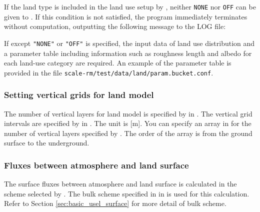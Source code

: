 If the land type is included in the land use setup by , neither \verb|NONE| nor \verb|OFF| can be given to . If this condition is not satisfied, the program immediately terminates without computation, outputting the following message to the LOG file:

If  except \verb|"NONE"| or \verb|"OFF"| is specified,
the input data of land use distribution and a parameter table including information such as roughness length and albedo for each land-use category are required.
An example of the parameter table is provided
in the file \verb|scale-rm/test/data/land/param.bucket.conf|.\\

\subsubsection{Setting vertical grids for land model}

The number of vertical layers for land model is specified by  in .
The vertical grid intervals are specified by  in . The unit is [m].
You can specify an array in  for the number of vertical layers specified by .
The order of the array is from the ground surface to the underground.


\subsubsection{Fluxes between atmosphere and land surface}
The surface fluxes between atmosphere and land surface is calculated in the scheme selected by . The bulk scheme specified in  in  is used for this calculation. Refer to Section \ref{sec:basic_usel_surface} for more detail of bulk scheme.


